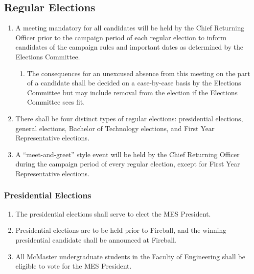 \hypertarget{regular-elections}{%
 \subsection{Regular Elections}
 \label{regular-elections}}
\begin{enumerate}
 \item
  A meeting mandatory for all candidates will be held by the Chief
  Returning Officer prior to the campaign period of each regular
  election to inform candidates of the campaign rules and important
  dates as determined by the Elections Committee.

  \begin{enumerate}
   \item
    The consequences for an unexcused absence from this meeting on the
    part of a candidate shall be decided on a case-by-case basis by the
    Elections Committee but may include removal from the election if the
    Elections Committee sees fit.
  \end{enumerate}
 \item
  There shall be four distinct types of regular elections: presidential
  elections, general elections, Bachelor of Technology elections, and
  First Year Representative elections.
 \item
  A ``meet-and-greet'' style event will be held by the Chief Returning
  Officer during the campaign period of every regular election, except
  for First Year Representative elections.


\end{enumerate}

\hypertarget{presidential-elections}{%
 \subsubsection{Presidential
  Elections}
 \label{presidential-elections}}
\begin{enumerate}
 \item
  The presidential elections shall serve to elect the MES President.
 \item
  Presidential elections are to be held prior to Fireball, and the
  winning presidential candidate shall be announced at Fireball.
 \item
  All McMaster undergraduate students in the Faculty of Engineering
  shall be eligible to vote for the MES President.

\end{enumerate}


